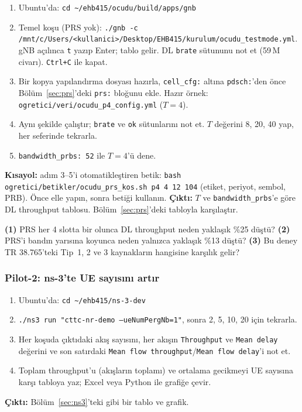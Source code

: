 \begin{pilot}
\begin{enumerate}[leftmargin=1.5em]
\item Ubuntu'da: \texttt{cd \textasciitilde/ehb415/ocudu/build/apps/gnb}
\item Temel koşu (PRS yok): \texttt{./gnb -c /mnt/c/Users/<kullanici>/Desktop/EHB415/kurulum/ocudu\_testmode.yml}. gNB açılınca \texttt{t} yazıp Enter; tablo gelir. DL \texttt{brate} sütununu not et (59\,M civarı). \texttt{Ctrl+C} ile kapat.
\item Bir kopya yapılandırma dosyası hazırla, \texttt{cell\_cfg:} altına \texttt{pdsch:}'den önce Bölüm~\ref{sec:prs}'deki \texttt{prs:} bloğunu ekle. Hazır örnek: \texttt{ogretici/veri/ocudu\_p4\_config.yml} ($T=4$).
\item Aynı şekilde çalıştır; \texttt{brate} ve \texttt{ok} sütunlarını not et. $T$ değerini 8, 20, 40 yap, her seferinde tekrarla.
\item \texttt{bandwidth\_prbs: 52} ile $T=4$'ü dene.
\end{enumerate}
\textbf{Kısayol:} adım 3--5'i otomatikleştiren betik: \texttt{bash ogretici/betikler/ocudu\_prs\_kos.sh p4 4 12 104} (etiket, periyot, sembol, PRB). Önce elle yapın, sonra betiği kullanın.
\textbf{Çıktı:} $T$ ve \texttt{bandwidth\_prbs}'e göre DL throughput tablosu. Bölüm~\ref{sec:prs}'deki tabloyla karşılaştır.
\end{pilot}

\begin{ipucu}
\textbf{(1)} PRS her 4 slotta bir olunca DL throughput neden yaklaşık \%25 düştü? \quad
\textbf{(2)} PRS'i bandın yarısına koyunca neden yalnızca yaklaşık \%13 düştü? \quad
\textbf{(3)} Bu deney TR 38.765'teki Tip~1, 2 ve 3 kaynakların hangisine karşılık gelir?
\end{ipucu}

\subsubsection{Pilot-2: ns-3'te UE sayısını artır}

\begin{pilot}
\begin{enumerate}[leftmargin=1.5em]
\item Ubuntu'da: \texttt{cd \textasciitilde/ehb415/ns-3-dev}
\item \texttt{./ns3 run "cttc-nr-demo --ueNumPergNb=1"}, sonra 2, 5, 10, 20 için tekrarla.
\item Her koşuda çıktıdaki akış sayısını, her akışın \texttt{Throughput} ve \texttt{Mean delay} değerini ve son satırdaki \texttt{Mean flow throughput}/\texttt{Mean flow delay}'i not et.
\item Toplam throughput'u (akışların toplamı) ve ortalama gecikmeyi UE sayısına karşı tabloya yaz; Excel veya Python ile grafiğe çevir.
\end{enumerate}
\textbf{Çıktı:} Bölüm~\ref{sec:ns3}'teki gibi bir tablo ve grafik.
\end{pilot}

